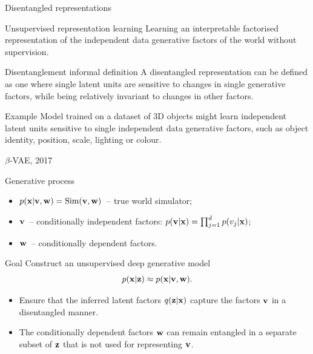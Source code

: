 

\begin{frame}
\titlepage
\end{frame}
\begin{frame}{Disentangled representations}
	\begin{block}{Unsupervised representation learning}
	    Learning an interpretable factorised representation of the independent data generative factors of the world without supervision. 
	\end{block}
	\begin{block}{Disentanglement informal definition}
	A disentangled representation can be defined as one where single latent units are sensitive to changes in single generative factors, while being relatively invariant to changes in other factors. 
	\end{block}
	\begin{block}{Example}
	Model trained on a dataset of 3D objects might learn independent latent units sensitive to single independent data generative factors, such as object identity, position, scale, lighting or colour. 
	\end{block}
\end{frame}
\begin{frame}{$\beta$-VAE, 2017}
	\begin{block}{Generative process}
	\begin{itemize}
	    \item $p(\mathbf{x} | \mathbf{v}, \mathbf{w}) = \text{Sim}(\mathbf{v}, \mathbf{w})$~-- true world simulator;
	    \item $\mathbf{v}$~-- conditionally independent factors: $p(\mathbf{v} | \mathbf{x}) = \prod_{j=1}^d p(v_j | \mathbf{x})$;
	    \item $\mathbf{w}$~-- conditionally dependent factors. 
	\end{itemize}
	\end{block}
	\begin{block}{Goal}
	Construct an unsupervised deep generative model
	\[
	    p(\mathbf{x} | \mathbf{z}) \approx p(\mathbf{x} | \mathbf{v}, \mathbf{w}).
	\]
	\vspace{-0.5cm}
	\begin{itemize}
	    \item Ensure that the inferred latent factors $q(\mathbf{z}|\mathbf{x})$ capture the factors $\mathbf{v}$ in a disentangled manner. 
	    \item The conditionally dependent factors $\mathbf{w}$ can remain entangled in a separate subset of $\mathbf{z}$ that is not used for representing $\mathbf{v}$. 
	\end{itemize}
	\end{block}
\end{frame}
